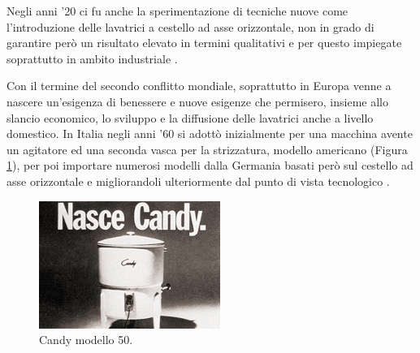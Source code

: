 Negli anni ’20 ci fu anche la sperimentazione di tecniche nuove come l’introduzione delle lavatrici a cestello ad asse orizzontale, non in grado di garantire però un risultato elevato in termini qualitativi e per questo impiegate soprattutto in ambito industriale \cite{asquer2007rivoluzione}.

Con il termine del secondo conflitto mondiale, soprattutto in Europa venne a nascere un’esigenza di benessere e nuove esigenze che permisero, insieme allo slancio economico, lo sviluppo e la diffusione delle lavatrici anche a livello domestico. 
In Italia negli anni ’60 si adottò inizialmente per una macchina avente un agitatore ed una seconda vasca per la strizzatura, modello americano (Figura \ref{fig:my_label}), per poi importare numerosi modelli dalla Germania basati però sul cestello ad asse orizzontale e migliorandoli ulteriormente dal punto di vista tecnologico \cite{asquer2007rivoluzione}.

\begin{figure}[H]
    \centering
    \includegraphics{Immagini/candy.jpg}
    \caption{Candy modello 50.}
    \label{fig:my_label}
\end{figure}
